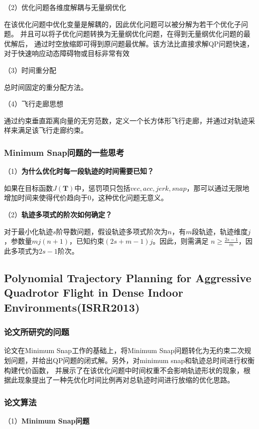 （2）优化问题各维度解耦与无量纲优化


在该优化问题中优化变量是解耦的，因此优化问题可以被分解为若干个优化子问题。
并且可以将子优化问题转换为无量纲优化问题，在得到无量纲优化问题的最优解后，
通过时空放缩即可得到原问题最优解。该方法比直接求解QP问题快速，对于快速响应动态障碍物或目标非常有效


（3）时间重分配


总时间固定的重分配方法。


（4）飞行走廊思想


通过约束垂直距离向量的无穷范数，定义一个长方体形飞行走廊，并通过对轨迹采样来满足该飞行走廊约束。
\subsubsection{Minimum Snap问题的一些思考}
（1）\textbf{为什么优化时每一段轨迹的时间需要已知？}


如果在目标函数$J(\textbf{T})$中，惩罚项只包括$vec,acc,jerk,snap$，那可以通过无限地增加时间来使得代价趋向于0，这种优化问题无意义。


（2）\textbf{轨迹多项式的阶次如何确定？}


对于最小化轨迹$s$阶导数问题，假设轨迹多项式阶次为$n$，有$m$段轨迹，轨迹维度$j$，参数量$mj(n+1)$，已知约束$(2s+m-1)j$。因此，则需满足
$n\geq \frac{2s-1}{m}$，因此多项式为$2s-1$阶次。
\subsection{Polynomial Trajectory Planning for Aggressive Quadrotor Flight in Dense Indoor Environments(ISRR2013)}
\subsubsection{论文所研究的问题}
论文在Minimum Snap工作的基础上，将Minimum Snap问题转化为无约束二次规划问题，并给出QP问题的闭式解。另外，对minimum snap和轨迹总时间进行权衡构建代价函数，
并展示了在该优化问题中时间权重不会影响轨迹形状的现象，根据此现象提出了一种先优化时间比例再对总轨迹时间进行放缩的优化思路。
\subsubsection{论文算法}
（1）\textbf{Minimum Snap问题}


